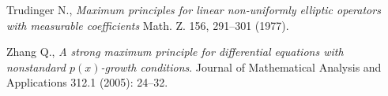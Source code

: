 \documentclass[12pt]{article}
\numberwithin{komcounter}{section}
\begin{document}
\begin{thebibliography}{A}

Trudinger N.,
\emph{Maximum principles for linear non-uniformly elliptic operators with measurable coefficients}
Math. Z. 156, 291--301 (1977).

Zhang Q.,
\emph{A strong maximum principle for differential equations with nonstandard $p(x)$-growth conditions}.
Journal of Mathematical Analysis and Applications 312.1 (2005): 24--32.
\end{thebibliography}
\end{document}
